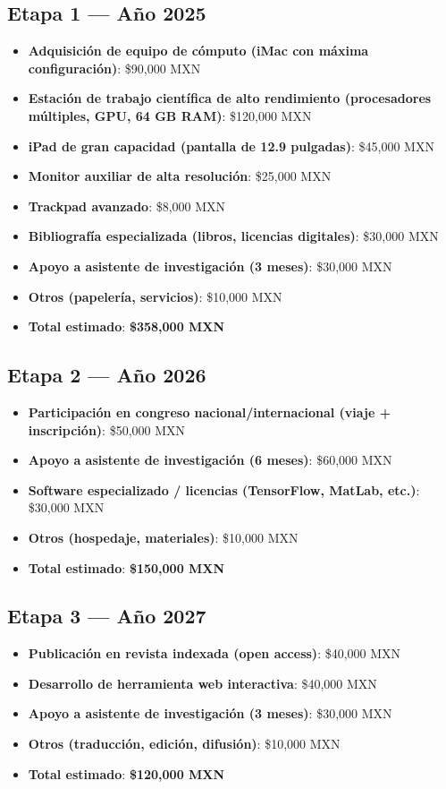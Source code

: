\documentclass[12pt]{article}
\begin{document}
\subsection*{Etapa 1 — Año 2025}
\begin{itemize}
  \item \textbf{Adquisición de equipo de cómputo (iMac con máxima configuración)}: \$90,000 MXN
  \item \textbf{Estación de trabajo científica de alto rendimiento (procesadores múltiples, GPU, 64 GB RAM)}: \$120,000 MXN
  \item \textbf{iPad de gran capacidad (pantalla de 12.9 pulgadas)}: \$45,000 MXN
  \item \textbf{Monitor auxiliar de alta resolución}: \$25,000 MXN
  \item \textbf{Trackpad avanzado}: \$8,000 MXN
  \item \textbf{Bibliografía especializada (libros, licencias digitales)}: \$30,000 MXN
  \item \textbf{Apoyo a asistente de investigación (3 meses)}: \$30,000 MXN
  \item \textbf{Otros (papelería, servicios)}: \$10,000 MXN
  \item \textbf{Total estimado}: \textbf{\$358,000 MXN}
\end{itemize}

\subsection*{Etapa 2 — Año 2026}
\begin{itemize}
  \item \textbf{Participación en congreso nacional/internacional (viaje + inscripción)}: \$50,000 MXN
  \item \textbf{Apoyo a asistente de investigación (6 meses)}: \$60,000 MXN
  \item \textbf{Software especializado / licencias (TensorFlow, MatLab, etc.)}: \$30,000 MXN
  \item \textbf{Otros (hospedaje, materiales)}: \$10,000 MXN
  \item \textbf{Total estimado}: \textbf{\$150,000 MXN}
\end{itemize}

\subsection*{Etapa 3 — Año 2027}
\begin{itemize}
  \item \textbf{Publicación en revista indexada (open access)}: \$40,000 MXN
  \item \textbf{Desarrollo de herramienta web interactiva}: \$40,000 MXN
  \item \textbf{Apoyo a asistente de investigación (3 meses)}: \$30,000 MXN
  \item \textbf{Otros (traducción, edición, difusión)}: \$10,000 MXN
  \item \textbf{Total estimado}: \textbf{\$120,000 MXN}
\end{itemize}
\end{document}
